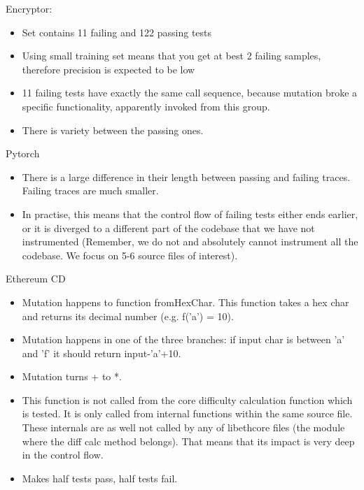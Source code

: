 \fi


\iffalse
{}

Encryptor:
\begin{itemize}
\item Set contains 11 failing and 122 passing tests
\item Using small training set means that you get at best 2 failing samples, therefore precision is expected to be low
\item 11 failing tests have exactly the same call sequence, because mutation broke a specific functionality, apparently invoked from this group.
\item There is variety between the passing ones.
\end{itemize}



Pytorch
\begin{itemize}
\item There is a large difference in their length between passing and failing traces. Failing traces are much smaller.
\item In practise, this means that the control flow of failing tests either ends earlier, or it is diverged to a different part of the codebase that we have not instrumented (Remember, we do not and absolutely cannot instrument all the codebase. We focus on 5-6 source files of interest).
\end{itemize}


Ethereum CD
\begin{itemize}
\item Mutation happens to function fromHexChar. This function takes a hex char and returns its decimal number (e.g. f('a') = 10).
\item Mutation happens in one of the three branches: if input char is between 'a' and 'f' it should return input-'a'+10.
\item Mutation turns + to *.
\item This function is not called from the core difficulty calculation function which is tested. It is only called from internal functions within the same source file. These internals are as well not called by any of libethcore files (the module where the  diff calc method belongs). That means that its impact is very deep in the control flow.
\item Makes half tests pass, half tests fail.
\end{itemize}

